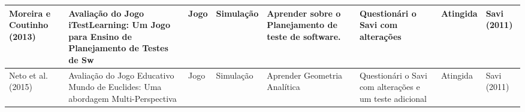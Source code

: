 \begin{table}
{\begin{tabular}{|L|m{5cm}|L|L|m{2.5cm}|m{2cm}|L|L|}
Moreira e Coutinho (2013)      & Avaliação do Jogo iTestLearning: Um Jogo para Ensino de Planejamento de Testes de Sw                                                                                                                   & Jogo                  & Simulação           & Aprender sobre o Planejamento de teste de software.                        & Questionári o Savi com alterações                                   & Atingida               & Savi (2011)                                             \\ \hline
Neto et al. (2015)             & Avaliação do Jogo Educativo Mundo de Euclides: Uma abordagem Multi-Perspectiva                                                                                                                         & Jogo                  & Simulação           & Aprender Geometria Analítica                                               & Questionári o Savi com alterações e um teste adicional              & Atingida               & Savi (2011)                                             \\ \hline
\end{tabular}}
\end{table}

